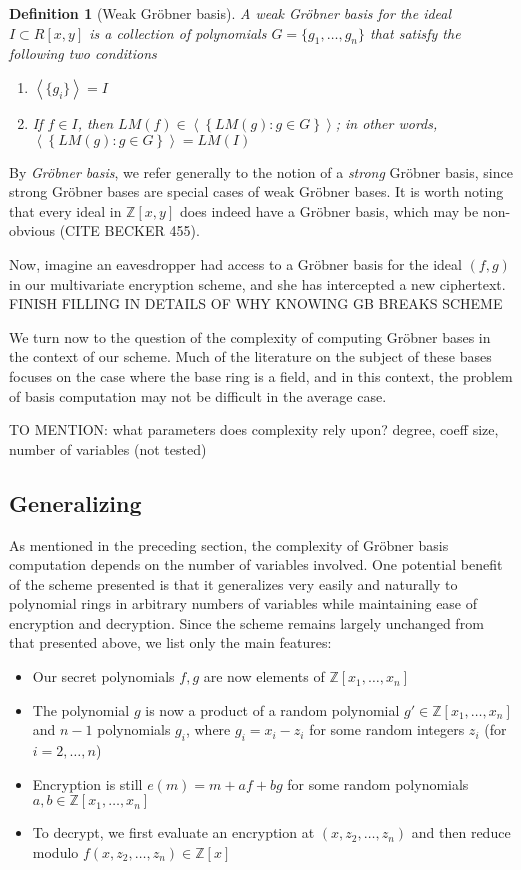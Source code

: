 \documentclass[11pt]{report}
\newtheorem{definition}{Definition}
\newcommand{\Zx}{\mathbb{Z}[x]}
\newcommand{\Zxn}{\mathbb{Z}[x_1,\ldots,x_n]}
\newcommand{\Zxy}{\mathbb{Z}[x,y]}
\begin{document}
\begin{definition}[Weak Gr\"obner basis]
A \emph{weak Gr\"obner basis} for the ideal $I\subset R[x,y]$ is a collection of polynomials $G=\{g_1,\dots,g_n\}$ that satisfy the following two conditions
\begin{enumerate}
\item $\left\langle\{g_i\}\right\rangle = I$
\item If $f\in I$, then $LM(f) \in \left\langle \left\{ LM(g) : g\in G\right\} \right\rangle$; in other words, $\left\langle \left\{ LM(g) : g\in G\right\} \right\rangle = LM(I)$
\end{enumerate}
\end{definition}

By \emph{Gr\"obner basis}, we refer generally to the notion of a \emph{strong} Gr\"obner basis, since strong Gr\"obner bases are special cases of weak Gr\"obner bases. It is worth noting that every ideal in $\Zxy$ does indeed have a Gr\"obner basis, which may be non-obvious (CITE BECKER 455).

Now, imagine an eavesdropper had access to a Gr\"obner basis for the ideal $(f,g)$ in our multivariate encryption scheme, and she has intercepted a new ciphertext. 
FINISH FILLING IN DETAILS OF WHY KNOWING GB BREAKS SCHEME

We turn now to the question of the complexity of computing Gr\"obner bases in the context of our scheme. Much of the literature on the subject of these bases focuses on the case where the base ring is a field, and in this context, the problem of basis computation may not be difficult in the average case. 

TO MENTION: what parameters does complexity rely upon? degree, coeff size, number of variables (not tested)

\subsection{Generalizing}
\label{sec:mv_generalizing}
As mentioned in the preceding section, the complexity of Gr\"obner basis computation depends on the number of variables involved. One potential benefit of the scheme presented is that it generalizes very easily and naturally to polynomial rings in arbitrary numbers of variables while maintaining ease of encryption and decryption. Since the scheme remains largely unchanged from that presented above, we list only the main features:

\begin{itemize}
\item Our secret polynomials $f,g$ are now elements of $\Zxn$
\item The polynomial $g$ is now a product of a random polynomial $g'\in \Zxn$ and $n-1$ polynomials $g_i$, where $g_i=x_i-z_i$ for some random integers $z_i$ (for $i=2,\dots,n$)
\item Encryption is still $e(m)=m+af+bg$ for some random polynomials $a,b\in \Zxn$
\item To decrypt, we first evaluate an encryption at $(x,z_2,\dots,z_n)$ and then reduce modulo $f(x,z_2,\dots,z_n) \in \Zx$
\end{itemize}
\end{document}
